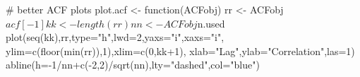 \begin{Schunk}
\begin{Sinput}
 # better ACF plots
 plot.acf <- function(ACFobj) {
   rr <- ACFobj$acf[-1]
   kk <- length(rr)
   nn <- ACFobj$n.used
   plot(seq(kk),rr,type="h",lwd=2,yaxs="i",xaxs="i",
        ylim=c(floor(min(rr)),1),xlim=c(0,kk+1),
        xlab="Lag",ylab="Correlation",las=1)
   abline(h=-1/nn+c(-2,2)/sqrt(nn),lty="dashed",col="blue")
 }
\end{Sinput}
\end{Schunk}
